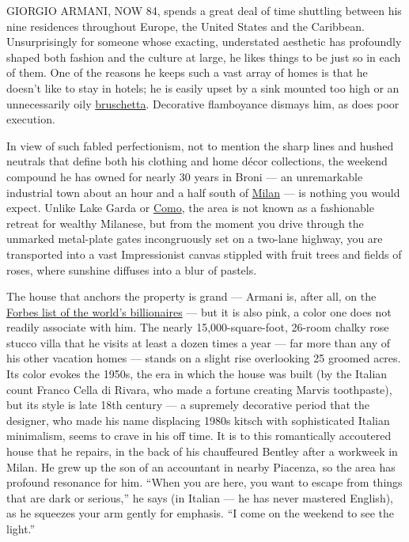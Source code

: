 GIORGIO ARMANI, NOW 84, spends a great deal of time shuttling between
his nine residences throughout Europe, the United States and the
Caribbean. Unsurprisingly for someone whose exacting, understated
aesthetic has profoundly shaped both fashion and the culture at large,
he likes things to be just so in each of them. One of the reasons he
keeps such a vast array of homes is that he doesn't like to stay in
hotels; he is easily upset by a sink mounted too high or an
unnecessarily oily
\href{https://cooking.nytimes3xbfgragh.onion/recipes/3846-sourdough-bruschetta}{bruschetta}.
Decorative flamboyance dismays him, as does poor execution.

In view of such fabled perfectionism, not to mention the sharp lines and
hushed neutrals that define both his clothing and home décor
collections, the weekend compound he has owned for nearly 30 years in
Broni --- an unremarkable industrial town about an hour and a half south
of
\href{https://www.nytimes3xbfgragh.onion/2015/01/11/travel/what-to-do-in-36-hours-in-milan.html}{Milan}
--- is nothing you would expect. Unlike Lake Garda or
\href{https://www.nytimes3xbfgragh.onion/2017/12/28/travel/lake-como-italy-younger-travelers.html}{Como},
the area is not known as a fashionable retreat for wealthy Milanese, but
from the moment you drive through the unmarked metal-plate gates
incongruously set on a two-lane highway, you are transported into a vast
Impressionist canvas stippled with fruit trees and fields of roses,
where sunshine diffuses into a blur of pastels.

The house that anchors the property is grand --- Armani is, after all,
on the
\href{https://www.forbes.com/profile/giorgio-armani/\#35f49c492c5b}{Forbes
list of the world's billionaires} --- but it is also pink, a color one
does not readily associate with him. The nearly 15,000-square-foot,
26-room chalky rose stucco villa that he visits at least a dozen times a
year --- far more than any of his other vacation homes --- stands on a
slight rise overlooking 25 groomed acres. Its color evokes the 1950s,
the era in which the house was built (by the Italian count Franco Cella
di Rivara, who made a fortune creating Marvis toothpaste), but its style
is late 18th century --- a supremely decorative period that the
designer, who made his name displacing 1980s kitsch with sophisticated
Italian minimalism, seems to crave in his off time. It is to this
romantically accoutered house that he repairs, in the back of his
chauffeured Bentley after a workweek in Milan. He grew up the son of an
accountant in nearby Piacenza, so the area has profound resonance for
him. ``When you are here, you want to escape from things that are dark
or serious,'' he says (in Italian --- he has never mastered English), as
he squeezes your arm gently for emphasis. ``I come on the weekend to see
the light.''


